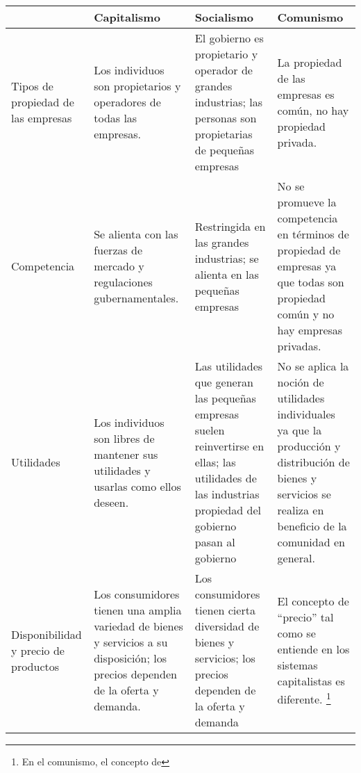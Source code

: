 \documentclass[
  man,
  floatsintext,
  longtable,
  a4paper,
  nolmodern,
  notxfonts,
  notimes,
  colorlinks=true,linkcolor=blue,citecolor=blue,urlcolor=blue]{apa7}
\begin{document}
\begin{longtable}[]{@{}
  >{\raggedright\arraybackslash}p{}
  >{\raggedright\arraybackslash}p{}
  >{\raggedright\arraybackslash}p{}
  >{\raggedright\arraybackslash}p{}@{}}
\toprule\noalign{}
\begin{minipage}[b]{\linewidth}\raggedright
\end{minipage} & \begin{minipage}[b]{\linewidth}\raggedright
Capitalismo
\end{minipage} & \begin{minipage}[b]{\linewidth}\raggedright
Socialismo
\end{minipage} & \begin{minipage}[b]{\linewidth}\raggedright
Comunismo
\end{minipage} \\
\midrule\noalign{}
\endhead
\bottomrule\noalign{}
\endlastfoot
Tipos de propiedad de las empresas & Los individuos son propietarios y
operadores de todas las empresas. & El gobierno es propietario y
operador de grandes industrias; las personas son propietarias de
pequeñas empresas & La propiedad de las empresas es común, no hay
propiedad privada. \\
Competencia & Se alienta con las fuerzas de mercado y regulaciones
gubernamentales. & Restringida en las grandes industrias; se alienta en
las pequeñas empresas & No se promueve la competencia en términos de
propiedad de empresas ya que todas son propiedad común y no hay empresas
privadas. \\
Utilidades & Los individuos son libres de mantener sus utilidades y
usarlas como ellos deseen. & Las utilidades que generan las pequeñas
empresas suelen reinvertirse en ellas; las utilidades de las industrias
propiedad del gobierno pasan al gobierno & No se aplica la noción de
utilidades individuales ya que la producción y distribución de bienes y
servicios se realiza en beneficio de la comunidad en general. \\
Disponibilidad y precio de productos & Los consumidores tienen una
amplia variedad de bienes y servicios a su disposición; los precios
dependen de la oferta y demanda. & Los consumidores tienen cierta
diversidad de bienes y servicios; los precios dependen de la oferta y
demanda & El concepto de ``precio'' tal como se entiende en los sistemas
capitalistas es diferente. \footnote{En el comunismo, el concepto de
}
\end{longtable}
\end{document}
